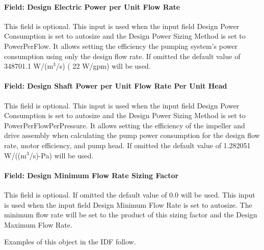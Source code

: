 \paragraph{Field: Design Electric Power per Unit Flow Rate}\label{field-design-electric-power-per-unit-flow-rate}

This field is optional. This input is used when the input field Design Power Consumption is set to autosize and the Design Power Sizing Method is set to PowerPerFlow. It allows setting the efficiency the pumping system's power consumption using only the design flow rate. If omitted the default value of 348701.1 W/(m\(^{3}\)/s) ( 22 W/gpm) will be used.

\paragraph{Field: Design Shaft Power per Unit Flow Rate Per Unit Head}\label{field-design-shaft-power-per-unit-flow-rate-per-unit-head}

This field is optional. This input is used when the input field Design Power Consumption is set to autosize and the Design Power Sizing Method is set to PowerPerFlowPerPressure. It allows setting the efficiency of the impeller and drive assembly when calculating the pump power consumption for the design flow rate, motor efficiency, and pump head. If omitted the default value of 1.282051 W/((m\(^{3}\)/s)-Pa) will be used.

\paragraph{Field: Design Minimum Flow Rate Sizing Factor}\label{field-design-minimum-flow-rate-sizing-factor}

This field is optional. If omitted the default value of 0.0 will be used. This input is used when the input field Design Minimum Flow Rate is set to autosize. The minimum flow rate will be set to the product of this sizing factor and the Design Maximum Flow Rate.

Examples of this object in the IDF follow.

